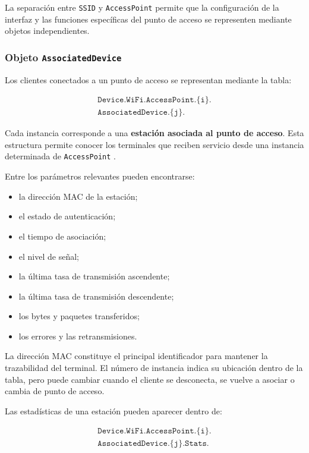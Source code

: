 La separación entre \texttt{SSID} y \texttt{AccessPoint} permite que la
configuración de la interfaz y las funciones específicas del punto de
acceso se representen mediante objetos independientes.


\subsubsection*{Objeto \texttt{AssociatedDevice}}

Los clientes conectados a un punto de acceso se representan mediante la
tabla:

\[
\begin{split}
    \texttt{Device.WiFi.AccessPoint.\{i\}.}\\
    \texttt{AssociatedDevice.\{j\}.}
\end{split}
\]

Cada instancia corresponde a una
\textbf{estación asociada al punto de acceso}. Esta estructura permite
conocer los terminales que reciben servicio desde una instancia
determinada de \texttt{AccessPoint} \cite{bbf_tr181}.

Entre los parámetros relevantes pueden encontrarse:

\begin{itemize}
    \item la dirección MAC de la estación;
    \item el estado de autenticación;
    \item el tiempo de asociación;
    \item el nivel de señal;
    \item la última tasa de transmisión ascendente;
    \item la última tasa de transmisión descendente;
    \item los bytes y paquetes transferidos;
    \item los errores y las retransmisiones.
\end{itemize}

La dirección MAC constituye el principal identificador para mantener la
trazabilidad del terminal. El número de instancia indica su ubicación
dentro de la tabla, pero puede cambiar cuando el cliente se desconecta,
se vuelve a asociar o cambia de punto de acceso.

Las estadísticas de una estación pueden aparecer dentro de:

\[
\begin{split}
    \texttt{Device.WiFi.AccessPoint.\{i\}.}\\
    \texttt{AssociatedDevice.\{j\}.Stats.}
\end{split}
\]

